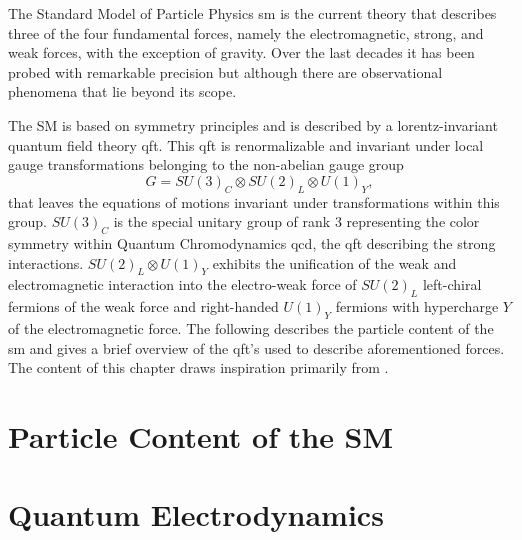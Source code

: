 The Standard Model of Particle Physics \ac{sm} is the current theory that describes three of the four fundamental forces, namely the electromagnetic, strong, and weak forces, with the exception of gravity. Over the last decades it has been probed with remarkable precision but although there are  observational phenomena that lie beyond its scope. 

The SM is based on symmetry principles and is described by a lorentz-invariant quantum field theory \ac{qft}. This qft is renormalizable and invariant under local gauge transformations belonging to the non-abelian gauge group 
\begin{equation}
    G = SU(3)_C \otimes SU(2)_L \otimes U(1)_Y,
\end{equation}
that leaves the equations of motions invariant under transformations within this group. $SU(3)_C$ is the special unitary group of rank 3 representing the color symmetry within Quantum Chromodynamics \ac{qcd}, the qft describing the strong interactions. $SU(2)_L \otimes U(1)_Y$ exhibits the unification of the weak and electromagnetic interaction into the electro-weak force of $SU(2)_L$ left-chiral fermions of the weak force and right-handed $U(1)_Y$ fermions with hypercharge $Y$ of the electromagnetic force. The following describes the particle content of the \ac{sm} and gives a brief overview of the qft's used to describe aforementioned forces. The content of this chapter draws inspiration primarily from \citep{hollik2010quantum,griffiths2020introduction,thomson2013modern}.


\section{Particle Content of the SM}


\section{Quantum Electrodynamics}